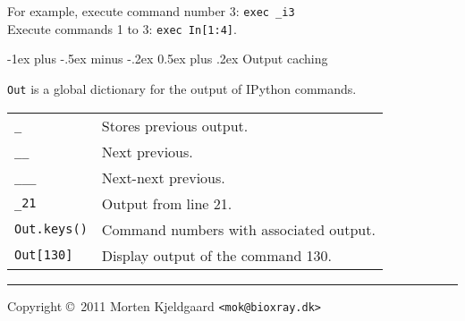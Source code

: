 \documentclass[10pt,landscape]{article}
\makeatletter
\renewcommand{\section}{\@startsection{section}{1}{0mm}%
                                {-1ex plus -.5ex minus -.2ex}%
                                {0.5ex plus .2ex}%
                                {\normalfont\large\bfseries}}
\makeatother
\begin{document}
\begin{multicols}{3}
For example, execute command number 3: \verb/exec _i3/ \\
Execute commands 1 to 3: \verb/exec In[1:4]/.


\section{Output caching}

\verb/Out/ is a global dictionary for the output of IPython commands.

\settowidth{\MyLen}{123456789012}
\begin{tabular}{@{}p{\the\MyLen}%
                @{}p{\linewidth-\the\MyLen}@{}}
  \verb!_! & Stores previous output.\\
  \verb!__! & Next previous.\\
  \verb!___! & Next-next previous.\\
  \verb!_21! & Output from line 21. \\
  \verb/Out.keys()/ & Command numbers with associated output.\\
  \verb/Out[130]/ & Display output of the command 130.\\
\end{tabular}








\rule{0.3\linewidth}{0.25pt}
\scriptsize

Copyright \copyright\ 2011 Morten Kjeldgaard \verb!<mok@bioxray.dk>!

\end{multicols}
\end{document}
